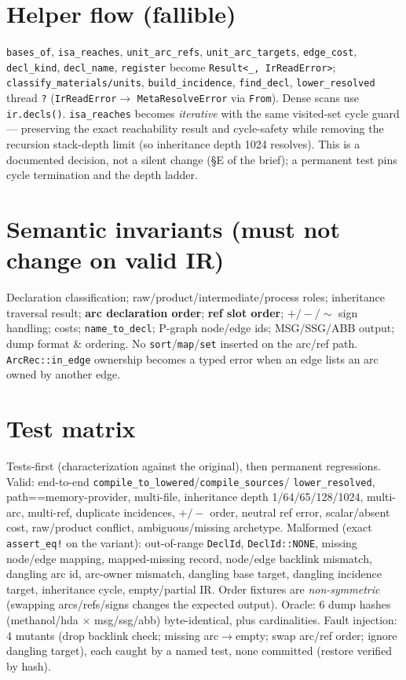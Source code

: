 \documentclass[11pt]{article}
\begin{document}
\section{Helper flow (fallible)}
\texttt{bases\_of}, \texttt{isa\_reaches}, \texttt{unit\_arc\_refs},
\texttt{unit\_arc\_targets}, \texttt{edge\_cost}, \texttt{decl\_kind},
\texttt{decl\_name}, \texttt{register} become \texttt{Result<\_, IrReadError>};
\texttt{classify\_materials/units}, \texttt{build\_incidence}, \texttt{find\_decl},
\texttt{lower\_resolved} thread \texttt{?} (\texttt{IrReadError}$\to$%
\texttt{MetaResolveError} via \texttt{From}). Dense scans use \texttt{ir.decls()}.
\texttt{isa\_reaches} becomes \emph{iterative} with the same visited-set cycle
guard --- preserving the exact reachability result and cycle-safety while removing
the recursion stack-depth limit (so inheritance depth 1024 resolves). This is a
documented decision, not a silent change (\S E of the brief); a permanent test
pins cycle termination and the depth ladder.

\section{Semantic invariants (must not change on valid IR)}
Declaration classification; raw/product/intermediate/process roles; inheritance
traversal result; \textbf{arc declaration order}; \textbf{ref slot order}; $+/-/\sim$
sign handling; costs; \texttt{name\_to\_decl}; P-graph node/edge ids; MSG/SSG/ABB
output; dump format \& ordering. No \texttt{sort}/\texttt{map}/\texttt{set} inserted on
the arc/ref path. \texttt{ArcRec::in\_edge} ownership becomes a typed error when an
edge lists an arc owned by another edge.

\section{Test matrix}
Tests-first (characterization against the original), then permanent regressions.
Valid: end-to-end \texttt{compile\_to\_lowered}/\texttt{compile\_sources}/%
\texttt{lower\_resolved}, path==memory-provider, multi-file, inheritance depth
1/64/65/128/1024, multi-arc, multi-ref, duplicate incidences, $+/-$ order, neutral
ref error, scalar/absent cost, raw/product conflict, ambiguous/missing archetype.
Malformed (exact \texttt{assert\_eq!} on the variant): out-of-range \texttt{DeclId},
\texttt{DeclId::NONE}, missing node/edge mapping, mapped-missing record, node/edge
backlink mismatch, dangling arc id, arc-owner mismatch, dangling base target,
dangling incidence target, inheritance cycle, empty/partial IR. Order fixtures are
\emph{non-symmetric} (swapping arcs/refs/signs changes the expected output).
Oracle: 6 dump hashes (methanol/hda $\times$ msg/ssg/abb) byte-identical, plus
cardinalities. Fault injection: 4 mutants (drop backlink check; missing arc$\to$empty;
swap arc/ref order; ignore dangling target), each caught by a named test, none
committed (restore verified by hash).
\end{document}
